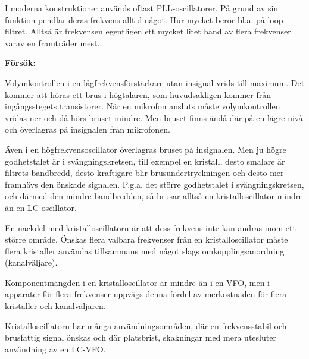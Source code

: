 I moderna konstruktioner används oftast PLL-oscillatorer.
På grund av sin funktion pendlar deras frekvens alltid något.
Hur mycket beror bl.a. på loop-filtret.
Alltså är frekvensen egentligen ett mycket litet band av flera frekvenser varav
en framträder mest.

\textbf{Försök:}

Volymkontrollen i en lågfrekvensförstärkare utan insignal vrids till maximum.
Det kommer att höras ett brus i högtalaren, som huvudsakligen kommer från
ingångsstegets transistorer.
När en mikrofon ansluts måste volymkontrollen vridas ner och då hörs bruset
mindre.
Men bruset finns ändå där på en lägre nivå och överlagras på insignalen från
mikrofonen.

Även i en högfrekvensoscillator överlagras bruset på insignalen.
Men ju högre godhetstalet är i svängningskretsen, till exempel en kristall, desto
smalare är filtrets bandbredd, desto kraftigare blir brusundertryckningen och
desto mer framhävs den önskade signalen.
P.g.a. det större godhetstalet i svängningskretsen, och därmed den mindre
bandbredden, så brusar alltså en kristalloscillator mindre än en LC-oscillator.

En nackdel med kristalloscillatorn är att dess frekvens inte kan
ändras inom ett större område.
Önskas flera valbara frekvenser från en kristalloscillator måste flera
kristaller användas tillsammans med något slags omkopplingsanordning
(kanalväljare).

Komponentmängden i en kristalloscillator är mindre än i en VFO, men i
apparater för flera frekvenser uppvägs denna fördel av merkostnaden
för flera kristaller och kanalväljaren.

Kristalloscillatorn har många användningsområden, där en
frekvensstabil och brusfattig signal önskas och där platsbrist,
skakningar med mera utesluter användning av en LC-VFO.
